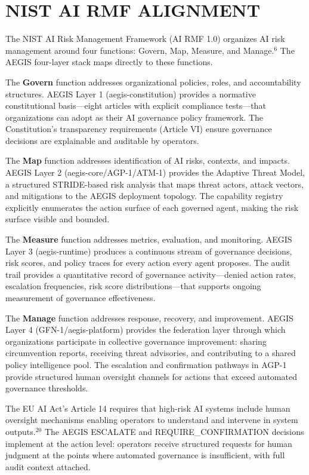 \documentclass{IEEEcsmag}
\begin{document}
\section{NIST AI RMF ALIGNMENT}

The NIST AI Risk Management Framework (AI RMF 1.0) organizes AI risk management around four functions: Govern, Map, Measure, and Manage.$^{6}$ The AEGIS four-layer stack maps directly to these functions.

The {\bf Govern} function addresses organizational policies, roles, and accountability structures. AEGIS Layer 1 (aegis-constitution) provides a normative constitutional basis---eight articles with explicit compliance tests---that organizations can adopt as their AI governance policy framework. The Constitution's transparency requirements (Article VI) ensure governance decisions are explainable and auditable by operators.

The {\bf Map} function addresses identification of AI risks, contexts, and impacts. AEGIS Layer 2 (aegis-core/AGP-1/ATM-1) provides the Adaptive Threat Model, a structured STRIDE-based risk analysis that maps threat actors, attack vectors, and mitigations to the AEGIS deployment topology. The capability registry explicitly enumerates the action surface of each governed agent, making the risk surface visible and bounded.

The {\bf Measure} function addresses metrics, evaluation, and monitoring. AEGIS Layer 3 (aegis-runtime) produces a continuous stream of governance decisions, risk scores, and policy traces for every action every agent proposes. The audit trail provides a quantitative record of governance activity---denied action rates, escalation frequencies, risk score distributions---that supports ongoing measurement of governance effectiveness.

The {\bf Manage} function addresses response, recovery, and improvement. AEGIS Layer 4 (GFN-1/aegis-platform) provides the federation layer through which organizations participate in collective governance improvement: sharing circumvention reports, receiving threat advisories, and contributing to a shared policy intelligence pool. The escalation and confirmation pathways in AGP-1 provide structured human oversight channels for actions that exceed automated governance thresholds.

The EU AI Act's Article 14 requires that high-risk AI systems include human oversight mechanisms enabling operators to understand and intervene in system outputs.$^{20}$ The AEGIS ESCALATE and REQUIRE\_CONFIRMATION decisions implement  at the action level: operators receive structured requests for human judgment at the points where automated governance is insufficient, with full audit context attached. 
\end{document}
